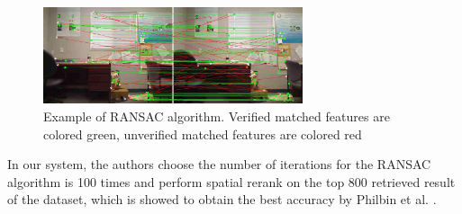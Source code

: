 \begin{figure}
    \centering
    \includegraphics[width=3.0in]{ransac.jpg}
    \caption{Example of RANSAC algorithm. Verified matched features are colored green, unverified matched features are colored red}
    \label{fig:ransac}
\end{figure}

In our system, the authors choose the number of iterations for the RANSAC algorithm is 100 times and perform spatial rerank on the top 800 retrieved result of the dataset, which is showed to obtain the best accuracy by Philbin et al. \cite{2}.
